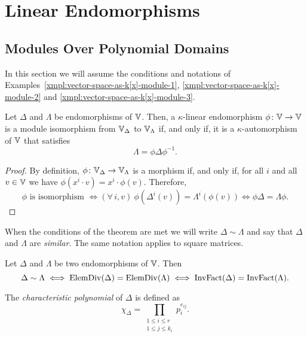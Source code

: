 \chapter{Linear Endomorphisms}

\section{Modules Over Polynomial Domains}

In this section we will assume the conditions and notations of Examples~\ref{xmpl:vector-space-as-k[x]-module-1}, \ref{xmpl:vector-space-as-k[x]-module-2} and \ref{xmpl:vector-space-as-k[x]-module-3}.

\begin{thm}\label{thm:similar-operators}
    Let\/ $\Delta$ and\/ $\Lambda$ be endomorphisms of\/ $\mathbb V$. Then, a\/ $\kappa$-linear endomorphism\/ $\phi\colon\mathbb V\to\mathbb V$ is a module isomorphism from\/ $\mathbb V_\Delta$ to\/ $\mathbb V_\Lambda$ if, and only if, it is a\/ $\kappa$-automorphism of\/ $\mathbb V$ that satisfies
    $$
        \Lambda = \phi\Delta\phi^{-1}.
    $$
\end{thm}

\begin{proof}
    By definition, $\phi\colon\mathbb V_\Delta\to\mathbb V_\Lambda$ is a morphism if, and  only if, for all $i$ and all $v\in\mathbb V$ we have $\phi(x^i\cdot v)=x^i\cdot\phi(v)$. Therefore,
    $$
        \phi\text{ is isomorphism }\iff (\forall\,i,v)\ \phi(\Delta^i(v))=\Lambda^i(\phi(v))
        \iff \phi\Delta=\Lambda\phi.
    $$
\end{proof}

\begin{ntn}
    When the conditions of the theorem are met we will write\/ $\Delta\sim\Lambda$ and say that\/ $\Delta$ and\/ $\Lambda$ are \textsl{similar}. The same notation applies to square matrices.
\end{ntn}

\begin{cor}
    Let\/ $\Delta$ and\/ $\Lambda$ be two endomorphisms of\/ $\mathbb V$. Then
    $$
        \Delta\sim\Lambda
            \iff \operatorname{ElemDiv}(\Delta)=\operatorname{ElemDiv}(\Lambda)
            \iff \operatorname{InvFact}(\Delta)=\operatorname{InvFact}(\Lambda).
    $$
\end{cor}

\begin{defn}
    The \textsl{characteristic polynomial} of $\Delta$ is defined as
    $$
        \chi_\Delta=\prod_{\substack{1\le i\le r\\1\le j\le k_i}}p_i^{e_{ij}}.
    $$
\end{defn}

